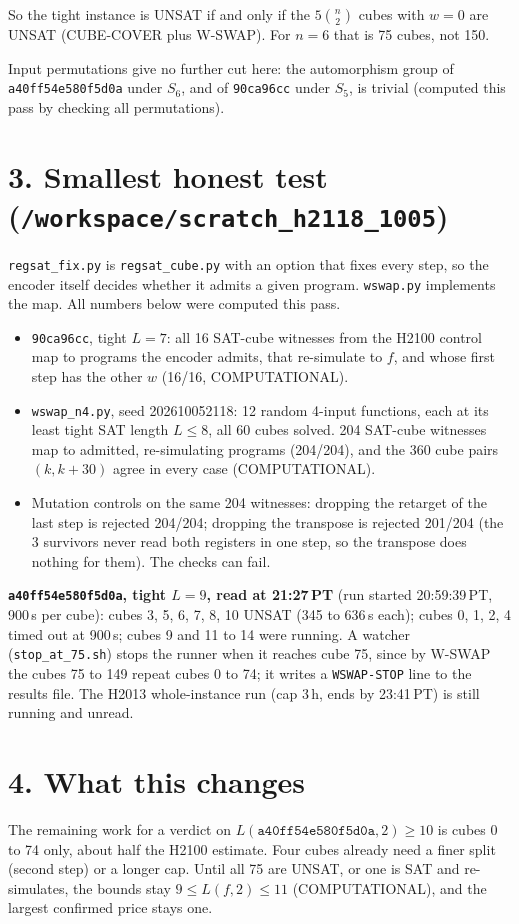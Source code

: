\documentclass[11pt]{article}
\begin{document}
So the tight instance is UNSAT if and only if the $5\binom{n}{2}$ cubes with $w=0$ are UNSAT (CUBE-COVER plus W-SWAP). For $n=6$ that is 75 cubes, not 150.

Input permutations give no further cut here: the automorphism group of \texttt{a40ff54e580f5d0a} under $S_6$, and of \texttt{90ca96cc} under $S_5$, is trivial (computed this pass by checking all permutations).

\section*{3. Smallest honest test (\texttt{/workspace/scratch\_h2118\_1005})}
\texttt{regsat\_fix.py} is \texttt{regsat\_cube.py} with an option that fixes every step, so the encoder itself decides whether it admits a given program. \texttt{wswap.py} implements the map. All numbers below were computed this pass.
\begin{itemize}
\item \texttt{90ca96cc}, tight $L=7$: all 16 SAT-cube witnesses from the H2100 control map to programs the encoder admits, that re-simulate to $f$, and whose first step has the other $w$ (16/16, COMPUTATIONAL).
\item \texttt{wswap\_n4.py}, seed 202610052118: 12 random 4-input functions, each at its least tight SAT length $L\le 8$, all 60 cubes solved. 204 SAT-cube witnesses map to admitted, re-simulating programs (204/204), and the 360 cube pairs $(k,k+30)$ agree in every case (COMPUTATIONAL).
\item Mutation controls on the same 204 witnesses: dropping the retarget of the last step is rejected 204/204; dropping the transpose is rejected 201/204 (the 3 survivors never read both registers in one step, so the transpose does nothing for them). The checks can fail.
\end{itemize}

\textbf{\texttt{a40ff54e580f5d0a}, tight $L=9$, read at 21:27\,PT} (run started 20:59:39\,PT, 900\,s per cube): cubes 3, 5, 6, 7, 8, 10 UNSAT (345 to 636\,s each); cubes 0, 1, 2, 4 timed out at 900\,s; cubes 9 and 11 to 14 were running. A watcher (\texttt{stop\_at\_75.sh}) stops the runner when it reaches cube 75, since by W-SWAP the cubes 75 to 149 repeat cubes 0 to 74; it writes a \texttt{WSWAP-STOP} line to the results file. The H2013 whole-instance run (cap 3\,h, ends by 23:41\,PT) is still running and unread.

\section*{4. What this changes}
The remaining work for a verdict on $L(\texttt{a40ff54e580f5d0a},2)\ge 10$ is cubes 0 to 74 only, about half the H2100 estimate. Four cubes already need a finer split (second step) or a longer cap. Until all 75 are UNSAT, or one is SAT and re-simulates, the bounds stay $9\le L(f,2)\le 11$ (COMPUTATIONAL), and the largest confirmed price stays one.
\end{document}
